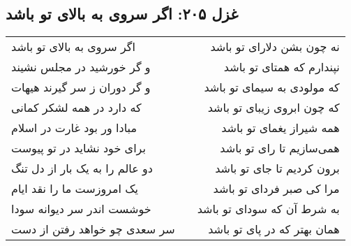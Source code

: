 \begin{center}
\section*{غزل ۲۰۵: اگر سروی به بالای تو باشد}
\label{sec:205}
\begin{longtable}{l p{0.5cm} r}
اگر سروی به بالای تو باشد
&&
نه چون بشن دلارای تو باشد
\\
و گر خورشید در مجلس نشیند
&&
نپندارم که همتای تو باشد
\\
و گر دوران ز سر گیرند هیهات
&&
که مولودی به سیمای تو باشد
\\
که دارد در همه لشکر کمانی
&&
که چون ابروی زیبای تو باشد
\\
مبادا ور بود غارت در اسلام
&&
همه شیراز یغمای تو باشد
\\
برای خود نشاید در تو پیوست
&&
همی‌سازیم تا رای تو باشد
\\
دو عالم را به یک بار از دل تنگ
&&
برون کردیم تا جای تو باشد
\\
یک امروزست ما را نقد ایام
&&
مرا کی صبر فردای تو باشد
\\
خوشست اندر سر دیوانه سودا
&&
به شرط آن که سودای تو باشد
\\
سر سعدی چو خواهد رفتن از دست
&&
همان بهتر که در پای تو باشد
\\
\end{longtable}
\end{center}
